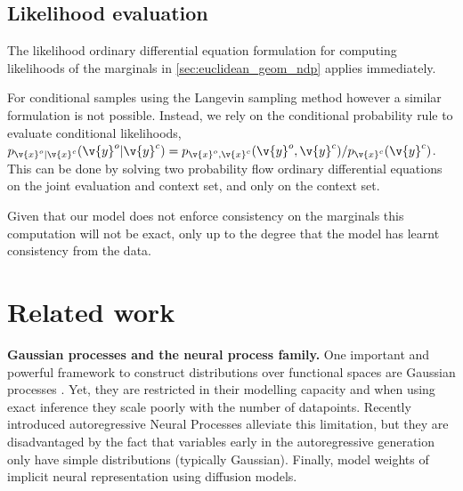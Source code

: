 \subsection{Likelihood evaluation}

The likelihood ordinary differential equation formulation for computing likelihoods of the marginals in \cref{sec:euclidean_geom_ndp} applies immediately.

For conditional samples using the Langevin sampling method however a similar formulation is not possible.
Instead, we rely on the conditional probability rule to evaluate conditional likelihoods, \(p_{\v{x}^o|\v{x}^c}(\v{y}^o|\v{y}^c) = p_{\v{x}^o,\v{x}^c}(\v{y}^o,\v{y}^c) / p_{\v{x}^c}(\v{y}^c)\).
This can be done by solving two probability flow ordinary differential equations on the joint evaluation and context set, and only on the context set.

Given that our model does not enforce consistency on the marginals this computation will not be exact, only up to the degree that the model has learnt consistency from the data.

\section{Related work}

\textbf{Gaussian processes and the neural process family.}
One important and powerful framework to construct distributions over functional spaces are Gaussian processes \parencite{rasmussen2003gaussian}.
Yet, they are restricted in their modelling capacity and when using exact inference they scale poorly with the number of datapoints.
Recently introduced autoregressive Neural Processes \parencite{bruinsma2023Autoregressive} alleviate this limitation, but they are disadvantaged by the fact that variables early in the autoregressive generation only have simple distributions (typically Gaussian).
Finally, \cite{dupont2022data} model weights of implicit neural representation using diffusion models.

